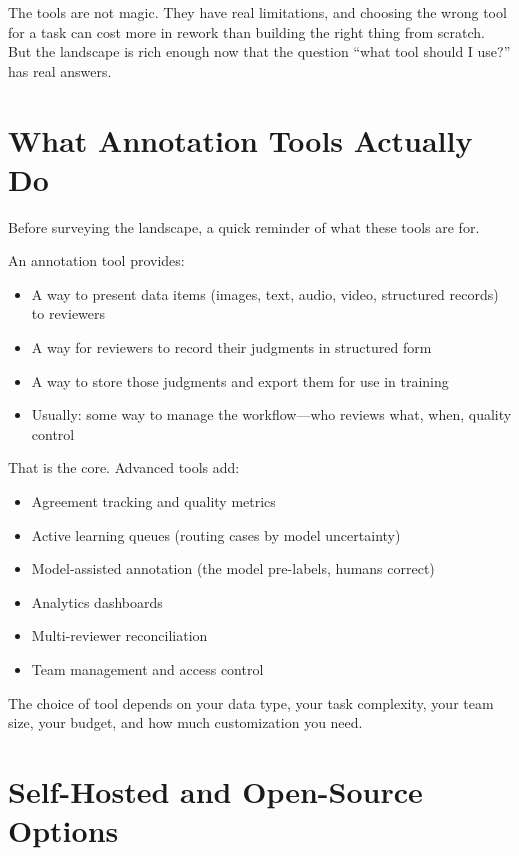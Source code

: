 The tools are not magic. They have real limitations, and choosing the wrong tool for a task can cost more in rework than building the right thing from scratch. But the landscape is rich enough now that the question ``what tool should I use?'' has real answers.

\section{What Annotation Tools Actually Do}
\label{sec:ch09-what-tools-do}

Before surveying the landscape, a quick reminder of what these tools are for.

An annotation tool provides:
\begin{itemize}
  \item A way to present data items (images, text, audio, video, structured records) to reviewers
  \item A way for reviewers to record their judgments in structured form
  \item A way to store those judgments and export them for use in training
  \item Usually: some way to manage the workflow---who reviews what, when, quality control
\end{itemize}

That is the core. Advanced tools add:
\begin{itemize}
  \item Agreement tracking and quality metrics
  \item Active learning queues (routing cases by model uncertainty)
  \item Model-assisted annotation (the model pre-labels, humans correct)
  \item Analytics dashboards
  \item Multi-reviewer reconciliation
  \item Team management and access control
\end{itemize}

The choice of tool depends on your data type, your task complexity, your team size, your budget, and how much customization you need.

\section{Self-Hosted and Open-Source Options}
\label{sec:ch09-open-source}

